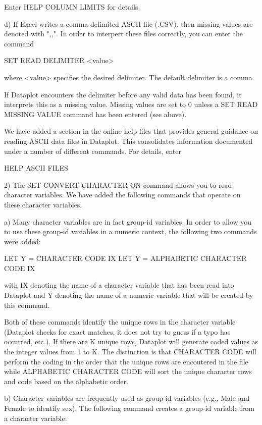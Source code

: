 {        Enter HELP COLUMN LIMITS for details.

    d) If Excel writes a comma delimited ASCII file (.CSV), then
       missing values are denoted with ",,".  In order to interpert
       these files correctly, you can enter the command

          SET READ DELIMITER  <value>

       where <value> specifies the desired delimiter.  The default
       delimiter is a comma.

       If Dataplot encounters the delimiter before any valid data
       has been found, it interprets this as a missing value. 
       Missing values are set to 0 unless a SET READ MISSING VALUE
       command has been entered (see above).

    We have added a section in the online help files that provides
    general guidance on reading ASCII data files in Dataplot.
    This consolidates information documented under a number of
    different commands.  For details, enter

         HELP ASCII FILES

 2) The SET CONVERT CHARACTER ON command allows you to read
    character variables.  We have added the following commands
    that operate on these character variables.

    a) Many character variables are in fact group-id variables.
       In order to allow you to use these group-id variables
       in a numeric context, the following two commands were added:

           LET Y = CHARACTER CODE IX
           LET Y = ALPHABETIC CHARACTER CODE IX

       with IX denoting the name of a character variable that
       has been read into Dataplot and Y denoting the name of a
       numeric variable that will be created by this command.

       Both of these commands identify the unique rows in the
       character variable (Dataplot checks for exact matches, it
       does not try to guess if a typo has occurred, etc.).  If
       there are K unique rows, Dataplot will generate coded values
       as the integer values from 1 to K.  The distinction is that
       CHARACTER CODE will perform the coding in the order that the
       unique rows are encoutered in the file while ALPHABETIC
       CHARACTER CODE will sort the unique character rows and
       code based on the alphabetic order.

    b) Character variables are frequently used as group-id
       variables (e.g., Male and Female to identify sex).  The
       following command creates a group-id variable from a
       character variable:

}

